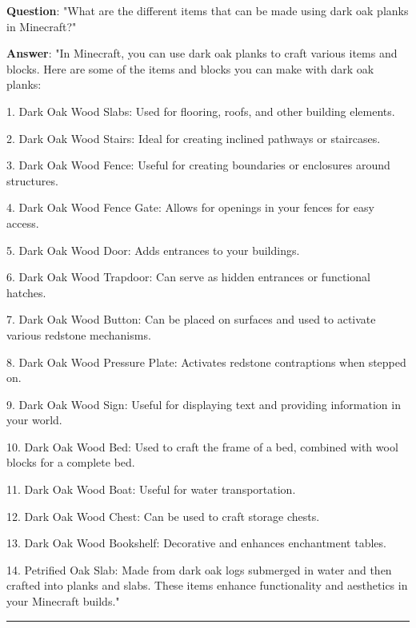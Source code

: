 \begin{prompt}[title={Example of World Knowledge Dataset}, label=World Knowledge Post Training Datasets]

\begin{center}
\begin{minipage}{\dimexpr0.95\linewidth}
\vspace{5pt}

\textbf{Question}: "What are the different items that can be made using dark oak planks in Minecraft?"

\textbf{Answer}: "In Minecraft, you can use dark oak planks to craft various items and blocks. Here are some of the items and blocks you can make with dark oak planks:

1. Dark Oak Wood Slabs: Used for flooring, roofs, and other building elements.

2. Dark Oak Wood Stairs: Ideal for creating inclined pathways or staircases.

3. Dark Oak Wood Fence: Useful for creating boundaries or enclosures around structures.

4. Dark Oak Wood Fence Gate: Allows for openings in your fences for easy access.

5. Dark Oak Wood Door: Adds entrances to your buildings.

6. Dark Oak Wood Trapdoor: Can serve as hidden entrances or functional hatches.

7. Dark Oak Wood Button: Can be placed on surfaces and used to activate various redstone mechanisms.

8. Dark Oak Wood Pressure Plate: Activates redstone contraptions when stepped on.

9. Dark Oak Wood Sign: Useful for displaying text and providing information in your world.

10. Dark Oak Wood Bed: Used to craft the frame of a bed, combined with wool blocks for a complete bed.

11. Dark Oak Wood Boat: Useful for water transportation.

12. Dark Oak Wood Chest: Can be used to craft storage chests.

13. Dark Oak Wood Bookshelf: Decorative and enhances enchantment tables.

14. Petrified Oak Slab: Made from dark oak logs submerged in water and then crafted into planks and slabs. These items enhance functionality and aesthetics in your Minecraft builds."

\rule{\linewidth}{0.4pt}


\end{minipage}
\end{center}
\end{prompt}
